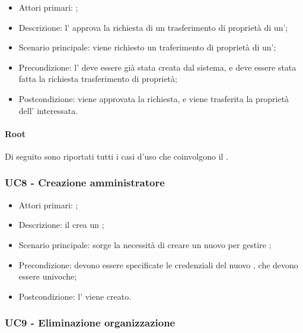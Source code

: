 \documentclass[../analisi-dei-requisiti]{subfiles}
\begin{document}
\begin{itemize}
\item Attori primari: ;
\item Descrizione: l' approva la richiesta di un trasferimento di proprietà di un';
\item Scenario principale: viene richiesto un traferimento di proprietà di un';
\item Precondizione: l' deve essere già stata creata dal sistema, e deve essere stata fatta la richiesta trasferimento di proprietà;
\item Postcondizione: viene approvata la richiesta, e viene trasferita la proprietà dell' interessata.

\end{itemize}
\paragraph{Root}
Di seguito sono riportati tutti i casi d'uso che coinvolgono il  .

\subsubsection{UC8 - Creazione amministratore}
\label{subsub:UC8}

\begin{itemize}
\item Attori primari: ;
\item Descrizione: il  crea un  ;
\item Scenario principale: sorge la necessità di creare un nuovo  per gestire ;
\item Precondizione: devono essere specificate le credenziali del nuovo , che devono essere univoche;
\item Postcondizione: l' viene creato.

\end{itemize}

\subsubsection{UC9 - Eliminazione organizzazione}
\label{subsub:UC9}
\end{document}

